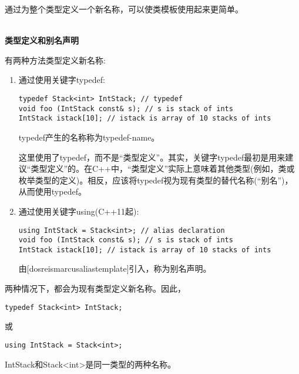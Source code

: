 
通过为整个类型定义一个新名称，可以使类模板使用起来更简单。

\hspace*{\fill} \\ %
\noindent
\textbf{类型定义和别名声明}

有两种方法类型定义新名称:

\begin{enumerate}
\item
通过使用关键字typedef:

\begin{lstlisting}[style=styleCXX]
typedef Stack<int> IntStack; // typedef
void foo (IntStack const& s); // s is stack of ints
IntStack istack[10]; // istack is array of 10 stacks of ints
\end{lstlisting}

typedef产生的名称称为typedef-name。

\begin{tcolorbox}[colback=webgreen!5!white,colframe=webgreen!75!black]
\hspace*{0.75cm}这里使用了typedef，而不是“类型定义”。其实，关键字typedef最初是用来建议“类型定义”的。在C++中，“类型定义”实际上意味着其他类型(例如，类或枚举类型的定义)。相反，应该将typedef视为现有类型的替代名称(“别名”)，从而使用typedef。
\end{tcolorbox}

\item
通过使用关键字using(C++11起):

\begin{lstlisting}[style=styleCXX]
using IntStack = Stack<int>; // alias declaration
void foo (IntStack const& s); // s is stack of ints
IntStack istack[10]; // istack is array of 10 stacks of ints
\end{lstlisting}

由[dosreismarcusaliastemplate]引入，称为别名声明。

\end{enumerate}

两种情况下，都会为现有类型定义新名称。因此，

\begin{lstlisting}[style=styleCXX]
typedef Stack<int> IntStack;
\end{lstlisting}

或

\begin{lstlisting}[style=styleCXX]
using IntStack = Stack<int>;
\end{lstlisting}

IntStack和Stack<int>是同一类型的两种名称。

